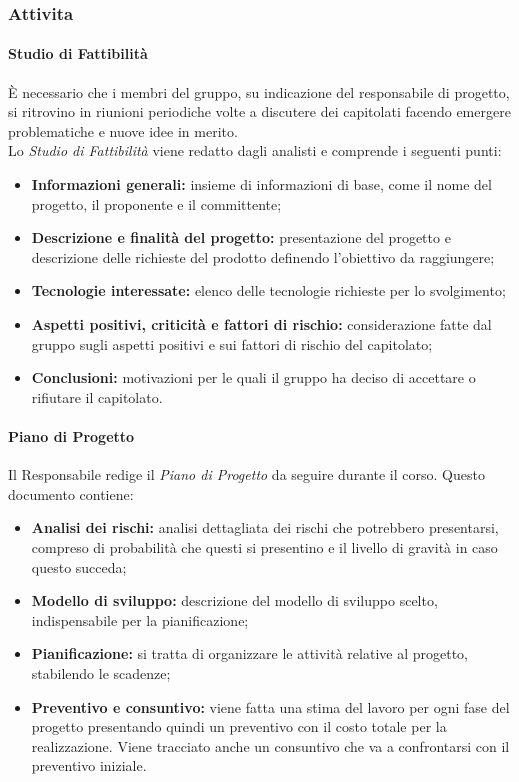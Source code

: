 \subsubsection{Attivita}
\paragraph{Studio di Fattibilità}
È necessario che i membri del gruppo, su indicazione del responsabile di progetto,  si ritrovino in riunioni periodiche volte a discutere dei capitolati facendo emergere problematiche e nuove idee in merito.\\
Lo \textit{Studio di Fattibilità} viene redatto dagli analisti e comprende i seguenti punti:
\begin{itemize}
    \item \textbf{Informazioni generali:} insieme di informazioni di base, come il nome del progetto, il proponente e il committente;
    \item \textbf{Descrizione e finalità del progetto:} presentazione del progetto e descrizione delle richieste del prodotto definendo l'obiettivo da raggiungere;
    \item \textbf{Tecnologie interessate:} elenco delle tecnologie richieste per lo svolgimento;
    \item \textbf{Aspetti positivi, criticità e fattori di rischio:} considerazione fatte dal gruppo sugli aspetti positivi e sui fattori di rischio del capitolato;
    \item \textbf{Conclusioni:} motivazioni per le quali il gruppo ha deciso di accettare o rifiutare il capitolato.
\end{itemize}
\paragraph{Piano di Progetto} Il Responsabile redige il \textit{Piano di Progetto} da seguire durante il corso. Questo documento contiene:
\begin{itemize}
    \item \textbf{Analisi dei rischi:} analisi dettagliata dei rischi che potrebbero presentarsi, compreso di probabilità che questi si presentino e il livello di gravità in caso questo succeda;
    
    \item \textbf{Modello di sviluppo:} descrizione del modello di sviluppo scelto, indispensabile per la pianificazione;
    
    \item \textbf{Pianificazione:} si tratta di organizzare le attività relative al progetto, stabilendo le scadenze;
    
    \item \textbf{Preventivo e consuntivo:} viene fatta una stima del lavoro per ogni fase del progetto presentando quindi un preventivo con il costo totale per la realizzazione. Viene tracciato anche un consuntivo che va a confrontarsi con il preventivo iniziale.
\end{itemize}

